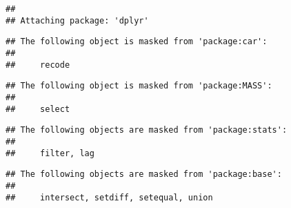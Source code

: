 \documentclass[
]{article}
\begin{document}
\begin{verbatim}
## 
## Attaching package: 'dplyr'
\end{verbatim}

\begin{verbatim}
## The following object is masked from 'package:car':
## 
##     recode
\end{verbatim}

\begin{verbatim}
## The following object is masked from 'package:MASS':
## 
##     select
\end{verbatim}

\begin{verbatim}
## The following objects are masked from 'package:stats':
## 
##     filter, lag
\end{verbatim}

\begin{verbatim}
## The following objects are masked from 'package:base':
## 
##     intersect, setdiff, setequal, union
\end{verbatim}
\end{document}
